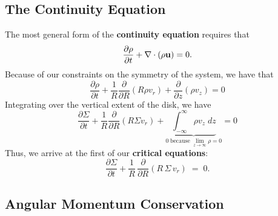 \subsection*{The Continuity Equation}

The most general form of the \textbf{continuity equation} requires that
\[
\frac{\partial \rho}{\partial t} + \nabla \cdot (\rho {\bf u}) = 0.
\]
Because of our constraints on the symmetry of the system, we have that
\[
\frac{\partial \rho}{\partial t} + \frac{1}{R}\frac{\partial}{\partial R}\left(R\rho v_r\right) + \frac{\partial}{\partial z} \left(\rho v_z\right) = 0
\]
Integrating over the vertical extent of the disk, we have
\[
\frac{\partial \Sigma}{\partial t} + \frac{1}{R}\frac{\partial}{\partial R}\left(R\Sigma v_r\right) + \underbrace{\int_{-\infty}^\infty \rho v_z\;dz}_{0 \;\text{because}\;\lim_{z\to\infty} \rho = 0}= 0
\]
Thus, we arrive at the first of our \textbf{critical equations}:
\begin{equation}
\boxed{\;
\frac{\partial \Sigma}{\partial t}
+ \frac{1}{R}\,\frac{\partial}{\partial R}\!\left(R\,\Sigma\,v_r\right) \;=\; 0.
\;}
\label{eq:continuity_disk_general}
\end{equation}

\subsection*{Angular Momentum Conservation}

